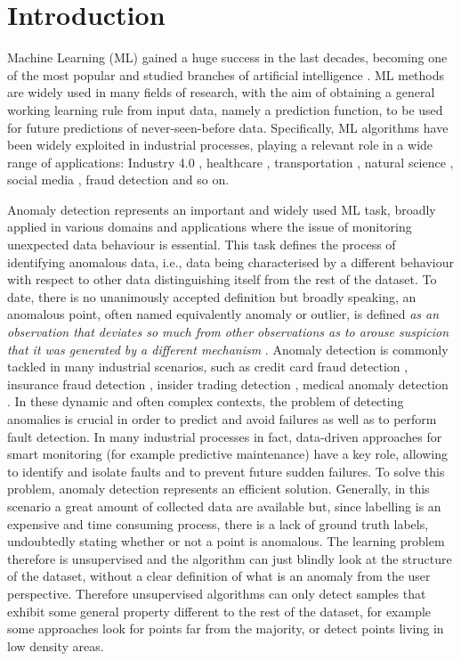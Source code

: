 \section{Introduction}
\label{intro}

Machine Learning (ML) gained a huge success in the last decades, becoming one of the most popular and studied branches of artificial intelligence \cite{jordan2015machine}. ML methods are widely used in many fields of research, with the aim of obtaining a general working learning rule from input data, namely a prediction function, to be used for future predictions of never-seen-before data.
Specifically, ML algorithms have been widely exploited in industrial processes, playing a relevant role in a wide range of applications: Industry 4.0 \cite{angelopoulos2019tacklin}, healthcare \cite{kourou2015machine}, transportation \cite{hamner2010predicting}, natural science \cite{yao2008quantitative}, social media \cite{balaji2021machine}, fraud detection \cite{awoyemi2017credit} and so on.

Anomaly detection represents an important and widely used ML task, broadly applied in various domains and applications where the issue of monitoring unexpected data behaviour is essential. This task defines the process of identifying anomalous data, i.e., data being characterised by a different behaviour with respect to other data distinguishing itself from the rest of the dataset. To date, there is no unanimously accepted definition but broadly speaking, an anomalous point, often named equivalently anomaly or outlier, is defined \textit{as an observation that deviates so much from other observations as to arouse suspicion that it was generated by a different mechanism} \cite{hawkins1980identification}. Anomaly detection is commonly tackled in many industrial scenarios, such as credit card fraud detection \cite{ghosh1994credit}, insurance fraud detection \cite{fawcett1999activity}, insider trading detection \cite{donoho2004early}, medical anomaly detection \cite{wong2003bayesian}. In these dynamic and often complex contexts, the problem of detecting anomalies is crucial in order to predict and avoid failures as well as to perform fault detection. In many industrial processes in fact, data-driven approaches for smart monitoring (for example predictive maintenance) have a key role, allowing to identify and isolate faults and to prevent future sudden failures. To solve this problem, anomaly detection represents an efficient solution.
Generally, in this scenario a great amount of collected data are available but, since labelling is an expensive and time consuming process, there is a lack of ground truth labels, undoubtedly stating whether or not a point is anomalous. The learning problem therefore is unsupervised and the algorithm can just blindly look at the structure of the dataset, without a clear definition of what is an anomaly from the user perspective. Therefore unsupervised algorithms can only detect samples that exhibit some general property different to the rest of the dataset, for example some approaches look for points far from the majority, or detect points living in low density areas.

